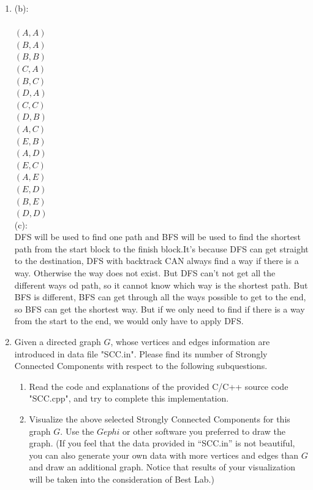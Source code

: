 \documentclass[12pt,a4paper]{article}
\makeatletter
\newtheorem*{solution}{Solution}
\theoremstyle{definition}
\renewenvironment{solution}[1][Solution] {\par\pushQED{\qed}\normalfont\topsep6\p@\@plus6\p@\relax\trivlist\item[\hskip\labelsep\bfseries#1\@addpunct{.}]\ignorespaces}{\popQED\endtrivlist\@endpefalse} \makeatother
\makeatother
\begin{document}
\begin{enumerate}
\begin{solution}
	    
	(b):\\
	\\
	$\left( A,A \right)$\\
	$\left( B,A \right)$\\
	$\left( B,B \right)$\\
	$\left( C,A \right)$\\
	$\left( B,C \right)$\\
	$\left( D,A \right)$\\
	$\left( C,C \right)$\\
	$\left( D,B \right)$\\
	$\left( A,C \right)$\\
	$\left( E,B \right)$\\
	$\left( A,D \right)$\\
	$\left( E,C \right)$\\
	$\left( A,E \right)$\\
	$\left( E,D \right)$\\
	$\left( B,E \right)$\\
	$\left( D,D \right)$\\
	
	(c):\\
	DFS will be used to find one path and BFS will be used to find the shortest path from the start block to the finish block.It's because DFS can get straight to the destination, DFS with backtrack CAN always find a way if there is a way. Otherwise the way does not exist. But DFS can't not get all the different ways od path, so it cannot  know which way is the shortest path. But BFS is different, BFS can get through all the ways possible to get to the end, so BFS can get the shortest way. But if we only need to find if there is a way from  the start to the end, we would only have to apply DFS.
	
	
	\end{solution}
	
	
	\item Given a directed graph $G$, whose vertices and edges information are introduced in data file "SCC.in". Please find its number of Strongly Connected Components with respect to the following subquestions.
    
    \begin{enumerate}
    	\item Read the code and explanations of the provided C/C++ source code "SCC.cpp", and try to complete this implementation.
    	\item Visualize the above selected Strongly Connected Components for this graph $G$. Use the $Gephi$ or other software you preferred to draw the graph. {\color{blue}(If you feel that the data provided in ``SCC.in'' is not beautiful, you can also generate your own data with more vertices and edges than $G$ and draw an additional graph. Notice that results of your visualization will be taken into the consideration of Best Lab.)}
    \end{enumerate}	
\end{enumerate}
    
\end{document}
